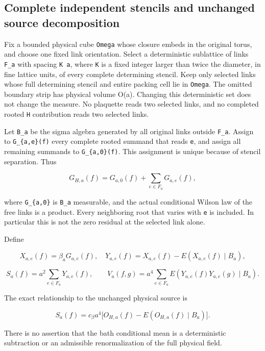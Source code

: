 \documentclass[
  11pt,
]{article}
\begin{document}
\hypertarget{complete-independent-stencils-and-unchanged-source-decomposition}{%
\subsection{Complete independent stencils and unchanged source
decomposition}\label{complete-independent-stencils-and-unchanged-source-decomposition}}

Fix a bounded physical cube \texttt{Omega} whose closure embeds in the
original torus, and choose one fixed link orientation. Select a
deterministic sublattice of links \texttt{F\_a} with spacing
\texttt{K\ a}, where \texttt{K} is a fixed integer larger than twice the
diameter, in fine lattice units, of every complete determining stencil.
Keep only selected links whose full determining stencil and entire
packing cell lie in \texttt{Omega}. The omitted boundary strip has
physical volume O(a). Changing this deterministic set does not change
the measure. No plaquette reads two selected links, and no completed
rooted \texttt{H} contribution reads two selected links.

Let \texttt{B\_a} be the sigma algebra generated by all original links
outside \texttt{F\_a}. Assign to \texttt{G\_\{a,e\}(f)} every complete
rooted summand that reads \texttt{e}, and assign all remaining summands
to \texttt{G\_\{a,0\}(f)}. This assignment is unique because of stencil
separation. Thus

\[
 G_{H,a}(f)=G_{a,0}(f)+\sum_{e\in F_a}G_{a,e}(f),
 \tag{3}
\]

where \texttt{G\_\{a,0\}} is \texttt{B\_a} measurable, and the actual
conditional Wilson law of the free links is a product. Every neighboring
root that varies with \texttt{e} is included. In particular this is not
the zero residual at the selected link alone.

Define

\[
 X_{a,e}(f)=\beta_aG_{a,e}(f),\quad
 Y_{a,e}(f)=X_{a,e}(f)-E(X_{a,e}(f)\mid B_a),
\]

\[
 S_a(f)=a^2\sum_{e\in F_a}Y_{a,e}(f),\qquad
 V_a(f,g)=a^4\sum_{e\in F_a}
 E(Y_{a,e}(f)Y_{a,e}(g)\mid B_a).
 \tag{4}
\]

The exact relationship to the unchanged physical source is

\[
 \boxed{S_a(f)=c_\beta a^4\big[O_{H,a}(f)-E(O_{H,a}(f)\mid B_a)\big].}
 \tag{5}
\]

There is no assertion that the bath conditional mean is a deterministic
subtraction or an admissible renormalization of the full physical field.
\end{document}
